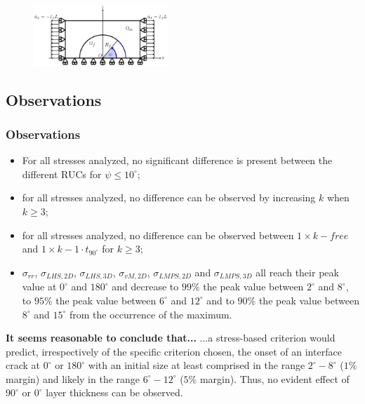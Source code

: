 \documentclass[first,firstsupp,lastsupp,last,hyperref,table]{ETHclass}
\begin{document}
\begin{frame}
\begin{columns}[c]
\begin{column}{0.5\textwidth}
\begin{figure}
\end{figure}
\end{column}
\end{columns}
\vspace{-0.3cm}
\centering
\begin{figure}
\centering
\includegraphics[width=0.45\textwidth]{refAngle.pdf}
\end{figure}
\end{frame}

\subsection{Observations}

\begin{frame}
\frametitle{Observations}
\vspace{-0.5cm}
\centering
\scriptsize
\begin{itemize}[label=]
\item For all stresses analyzed, no significant difference is present between the different RUCs for $\psi\leq10^{\circ}$;
\item for all stresses analyzed, no difference can be observed by increasing $k$ when $k\geq3$;
\item for all stresses analyzed, no difference can be observed between $1\times  k-free$ and $1\times  k-1\cdot t_{90^{\circ}}$ for $k\geq3$;
\item $\sigma_{rr}$, $\sigma_{LHS,2D}$, $\sigma_{LHS,3D}$, $\sigma_{vM,2D}$, $\sigma_{LMPS,2D}$ and $\sigma_{LMPS,3D}$ all reach their peak value at $0^{\circ}$ and $180^{\circ}$ and decrease to $99\%$ the peak value between $2^{\circ}$ and $8^{\circ}$, to $95\%$ the peak value between $6^{\circ}$ and $12^{\circ}$ and to $90\%$ the peak value between $8^{\circ}$ and $15^{\circ}$ from the occurrence of the maximum.
\end{itemize}
\begin{alertblock}{\centering\scriptsize\bf It seems reasonable to conclude that...}
...a stress-based criterion would predict, irrespectively of the specific criterion chosen, the onset of an interface crack at $0^{\circ}$ or $180^{\circ}$ with an initial size at least comprised in the range $2^{\circ}-8^{\circ}$ ($1\%$ margin) and likely in the range $6^{\circ}-12^{\circ}$ ($5\%$ margin). Thus, no evident effect of $90^{\circ}$ or $0^{\circ}$ layer thickness can be observed.
\end{alertblock}
\end{frame}
\end{document}

